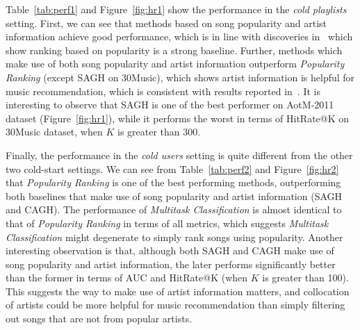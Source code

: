 Table~\ref{tab:perf1} and Figure~\ref{fig:hr1} show the performance in the \emph{cold playlists} setting.
First, we can see that methods based on song popularity and artist information achieve good performance,
which is in line with discoveries in~\cite{bonnin2013evaluating,jannach2015beyond,bonnin2015automated} which 
show ranking based on popularity is a strong baseline.
Further, methods which make use of both song popularity and artist information
outperform {\it Popularity Ranking} (except SAGH on 30Music), which shows artist information is helpful for music recommendation,
which is consistent with results reported in~\cite{bonnin2013evaluating,bonnin2015automated}.
%
It is interesting to observe that SAGH is one of the best performer on AotM-2011 dataset (Figure~\ref{fig:hr1}), 
while it performs the worst in terms of HitRate@K on 30Music dataset, when $K$ is greater than 300.
%



Finally, the performance in the \emph{cold users} setting %
is quite different from the other two cold-start settings.
%
We can see from Table~\ref{tab:perf2} and Figure~\ref{fig:hr2} that {\it Popularity Ranking} is one of the best performing methods,
outperforming both baselines that make use of song popularity and artist information (\ie SAGH and CAGH).
The performance of {\it Multitask Classification} is almost identical to that of {\it Popularity Ranking} in terms of all metrics,
which suggests {\it Multitask Classification} might degenerate to simply rank songs using popularity.
Another interesting observation is that, although both SAGH and CAGH make use of song popularity and artist information,
the later performs significantly better than the former in terms of AUC and HitRate@K (when $K$ is greater than 100).
This suggests the way to make use of artist information matters,
and collocation of artists could be more helpful for music recommendation than simply filtering out songs 
that are not from popular artists.


